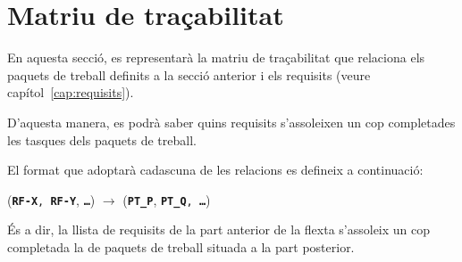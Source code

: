 \documentclass[a4paper,12pt]{ThesisStyle}
\begin{document}
\section{Matriu de traçabilitat}
\label{sec:matriu_tracabilitat}

En aquesta secció, es representarà la matriu de traçabilitat que relaciona els paquets de treball definits a la secció anterior i els requisits (veure capítol~\ref{cap:requisits}).

D'aquesta manera, es podrà saber quins requisits s'assoleixen un cop completades les tasques dels paquets de treball.

El format que adoptarà cadascuna de les relacions es defineix a continuació:
\\[8pt]
\centerline{(\texttt{\textbf{RF-X}, \texttt{\textbf{RF-Y}}}, \texttt{\textbf{\ldots}}) $\longrightarrow$ (\texttt{\textbf{PT\_P}}, \texttt{\textbf{PT\_Q}, \texttt{\textbf{\ldots}}})}

És a dir, la llista de requisits de la part anterior de la flexta s'assoleix un cop completada la de paquets de treball situada a la part posterior.
\end{document}
